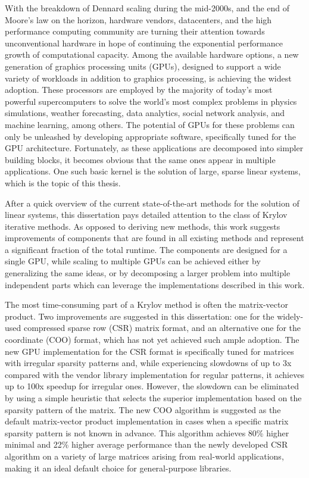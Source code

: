 With the breakdown of Dennard scaling during the mid-2000s, and the end of
Moore's law on the horizon, hardware vendors, datacenters, and the high
performance computing community are turning their attention towards unconventional
hardware in hope of continuing the exponential performance growth of
computational capacity. Among the available hardware options, a new generation
of graphics processing units (GPUs), designed to support a wide variety of
workloads in addition to graphics processing, is achieving the widest adoption.
These processors are employed by the majority of today's most powerful
supercomputers to solve the world's most complex problems in physics
simulations, weather forecasting, data analytics, social network analysis, and
machine learning, among others. The potential of GPUs for these problems can
only be unleashed by developing appropriate software, specifically tuned for the
GPU architecture.  Fortunately, as these applications are decomposed into
simpler building blocks, it becomes obvious that the same ones appear in
multiple applications. One such basic kernel is the solution of large, sparse
linear systems, which is the topic of this thesis.

After a quick overview of the current state-of-the-art methods for the solution
of linear systems, this dissertation pays detailed attention to the class of
Krylov iterative methods. As opposed to deriving new methods, this work suggests
improvements of components that are found in all existing methods and represent
a significant fraction of the total runtime. The components are designed for a
single GPU, while scaling to multiple GPUs can be achieved either by
generalizing the same ideas, or by decomposing a larger problem into multiple
independent parts which can leverage the implementations described in this work.

The most time-consuming part of a Krylov method is often the matrix-vector
product. Two improvements are suggested in this dissertation: one for the
widely-used compressed sparse row (CSR) matrix format, and an alternative one
for the coordinate (COO) format, which has not yet achieved such ample adoption.
The new GPU implementation for the CSR format is specifically tuned for matrices
with irregular sparsity patterns and, while experiencing slowdowns of up to 3x
compared with the vendor library implementation for regular patterns, it
achieves up to 100x speedup for irregular ones.  However, the slowdown can be
eliminated by using a simple heuristic that selects the superior implementation
based on the sparsity pattern of the matrix.  The new COO algorithm is suggested
as the default matrix-vector product implementation in cases when a specific
matrix sparsity pattern is not known in advance. This algorithm achieves
80\% higher minimal and 22\% higher average performance than the newly developed
CSR algorithm on a variety of large matrices arising from real-world
applications, making it an ideal default choice for general-purpose libraries.

